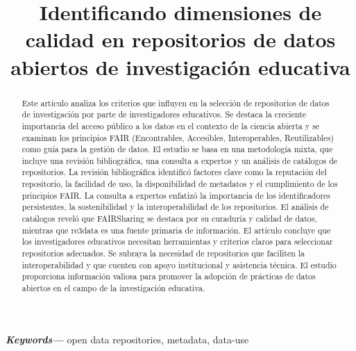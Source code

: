 \documentclass[runningheads]{llncs}
\title{Identificando dimensiones de calidad en repositorios de datos abiertos de investigación educativa}
\providecommand{\keywords}[1]
{
  \small	
  \textbf{\textit{Keywords---}} #1
}
\begin{document}
\maketitle

\begin{abstract}
Este artículo analiza los criterios que influyen en la selección de repositorios de datos de investigación por parte de investigadores educativos. Se destaca la creciente importancia del acceso público a los datos en el contexto de la ciencia abierta y se examinan los principios FAIR (Encontrables, Accesibles, Interoperables, Reutilizables) como guía para la gestión de datos. El estudio se basa en una metodología mixta, que incluye una revisión bibliográfica, una consulta a expertos y un análisis de catálogos de repositorios.
La revisión bibliográfica identificó factores clave como la reputación del repositorio, la facilidad de uso, la disponibilidad de metadatos y el cumplimiento de los principios FAIR. La consulta a expertos enfatizó la importancia de los identificadores persistentes, la sostenibilidad y la interoperabilidad de los repositorios. El análisis de catálogos reveló que FAIRSharing se destaca por su curaduría y calidad de datos, mientras que re3data es una fuente primaria de información.
El artículo concluye que los investigadores educativos necesitan herramientas y criterios claros para seleccionar repositorios adecuados. Se subraya la necesidad de repositorios que faciliten la interoperabilidad y que cuenten con apoyo institucional y asistencia técnica. El estudio proporciona información valiosa para promover la adopción de prácticas de datos abiertos en el campo de la investigación educativa.
      
\end{abstract}
\keywords{open data repositories, metadata, data-use}
\end{document}
